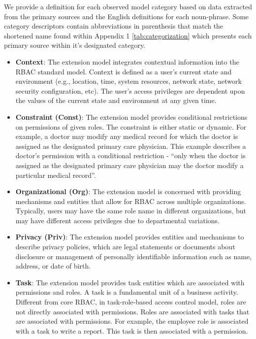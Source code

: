 We provide a definition for each observed model category based on data extracted from the primary sources and the English definitions for each noun-phrase.
Some category descriptors contain abbreviations in parenthesis that match the shortened name found within Appendix 1 \ref{tab:categorization} which presents each primary source within it's designated category.

\begin{itemize}

  \item \textbf{Context}: The extension model integrates contextual information into the RBAC standard model. Context is defined as a user's current state and environment (e.g., location, time, system resources, network state, network security configuration, etc). The user's access privileges are dependent upon the values of the current state and environment at any given time.

  \item \textbf{Constraint (Const)}: The extension model provides conditional restrictions on permissions of given roles. The constraint is either static or dynamic. For example, a doctor may modify any medical record for which the doctor is assigned as the designated primary care physician. This example describes a doctor's permission with a conditional restriction - ``only when the doctor is assigned as the designated primary care physician may the doctor modify a particular medical record''.

  \item \textbf{Organizational (Org)}: The extension model is concerned with providing mechanisms and entities that allow for RBAC across multiple organizations. Typically, users may have the same role name in different organizations, but may have different access privileges due to departmental variations.
  
  \item \textbf{Privacy (Priv)}: The extension model provides entities and mechanisms to describe privacy policies, which are legal statements or documents about disclosure or management of personally identifiable information such as name, address, or date of birth.
  
  \item \textbf{Task}: The extension model provides task entities which are associated with permissions and roles. A task is a fundamental unit of a business activity. Different from core RBAC, in task-role-based access control model, roles are not directly associated with permissions. Roles are associated with tasks that are associated with permissions. For example, the employee role is associated with a task to write a report. This task is then associated with a permission.


\end{itemize}
